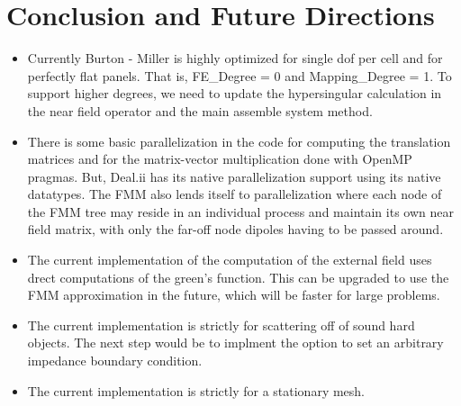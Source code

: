 \chapter{Conclusion and Future Directions}\label{chapter:conclusion-future-directions}

\begin{itemize}
    \item Currently Burton - Miller is highly optimized for single dof per cell and for perfectly flat panels. That is, FE\_Degree = 0 and Mapping\_Degree = 1. To support higher degrees, we need to update the hypersingular calculation in the near field operator and the main assemble system method.
    \item There is some basic parallelization in the code for computing the translation matrices and for the matrix-vector multiplication done with OpenMP pragmas. But, Deal.ii has its native parallelization support using its native datatypes. The FMM also lends itself to parallelization where each node of the FMM tree may reside in an individual process and maintain its own near field matrix, with only the far-off node dipoles having to be passed around.\
    \item The current implementation of the computation of the external field uses drect computations of the green's function. This can be upgraded to use the FMM approximation in the future, which will be faster for large problems.
    \item The current implementation is strictly for scattering off of sound hard objects. The next step would be to implment the option to set an arbitrary impedance boundary condition.
    \item The current implementation is strictly for a  stationary mesh.
\end{itemize}
